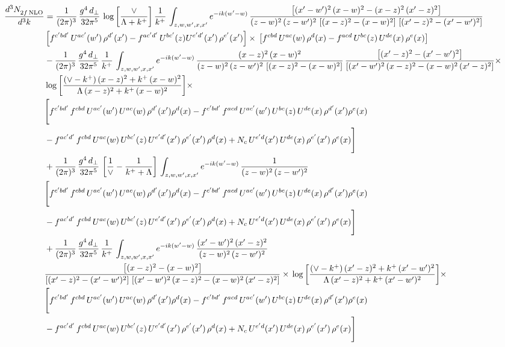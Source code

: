 \documentclass[9pt]{article}
\numberwithin{equation}{section}
\begin{document}
\begin{align}
    \frac{d^{3}N_{2f\,\rm NLO}^{\rm}}{d^{3}k}  & = \frac{1}{(2\pi)^{3}}\, \frac{g^{4}\,d_{\perp}}{32\pi^{5}}\,\log{\left[\frac{\vee}{\Lambda + k^{+}}\right]}\,\frac{1}{k^{+}}\,\int_{z,w,w^{\prime},x,x'} e^{-ik(w^{\prime}-w)}\,\frac{\left[(x'-w')^{2}\, (x-w)^{2} - (x-z)^{2}\, (x'-z)^{2}\right]}{(z-w)^{2}\, (z-w')^{2}\,\left[(x-z)^{2} - (x-w)^{2}\right]\, \left[(x'-z)^{2} - (x'-w')^{2}\right]}\notag \\ &   \left[f^{c'bd'}\, U^{ac'}(w')\,\rho^{d'}(x')-f^{ac'd'}\, U^{bc'}(z)U^{e'd'}(x')\, \rho^{e'}(x')\right]\times\, \left[f^{cbd}\, U^{ac}(w)\,\rho^{d}(x) - f^{acd}\, U^{bc}(z)\,U^{de}(x)\, \rho^{e}(x)\right] \notag \\ & - \frac{1}{(2\pi)^{3}}\, \frac{g^{4}\,d_{\perp}}{32\pi^{5}}\,\frac{1}{k^{+}}\,\int_{z,w,w^{\prime},x,x'} e^{-ik(w^{\prime}-w)}\,\frac{(x-z)^{2}\, (x-w)^{2}}{(z-w)^{2}\, (z-w')^{2}\,\left[(x-z)^{2} - (x-w)^{2}\right]}\,\frac{\left[(x'-z)^{2}-(x'-w')^{2}\right]}{\left[(x'-w')^{2}\, (x-z)^{2} - (x-w)^{2}\, (x'-z)^{2}\right]}\times\notag \\ & \log{\left[\frac{(\vee - k^{+})\, (x-z)^{2} + k^{+}\, (x-w)^{2}}{\Lambda\, (x-z)^{2} + k^{+}\, (x-w)^{2}}\right]}\times\notag \\ & \Bigg[f^{c'bd'}\,f^{cbd}\, U^{ac'}(w')\,U^{ac}(w)\,\rho^{d'}(x')\rho^{d}(x)- f^{c'bd'}\,f^{acd}\,U^{ac'}(w')\,U^{bc}(z)\,U^{de}(x)\,\rho^{d'}(x')\rho^{e}(x) \notag \\ & -f^{ac'd'}\,f^{cbd}\,U^{ac}(w)\,U^{bc'}(z)\,U^{e'd'}(x')\,\rho^{e'}(x')\,\rho^{d}(x) +N_{c}\,U^{e'd}(x')\,U^{de}(x)\,\rho^{e'}(x')\,\rho^{e}(x)\Bigg] \notag \\ & + \frac{1}{(2\pi)^{3}}\, \frac{g^{4}\,d_{\perp}}{32\pi^{5}}\,\left[\frac{1}{\vee} - \frac{1}{k^{+} + \Lambda}\right]\,\int_{z,w,w^{\prime},x,x'} e^{-ik(w^{\prime}-w)}\,\frac{1}{(z-w)^{2}\, (z-w')^{2}}\notag \\ & \Bigg[f^{c'bd'}\,f^{cbd}\, U^{ac'}(w')\,U^{ac}(w)\,\rho^{d'}(x')\rho^{d}(x)- f^{c'bd'}\,f^{acd}\,U^{ac'}(w')\,U^{bc}(z)\,U^{de}(x)\,\rho^{d'}(x')\rho^{e}(x) \notag \\ & -f^{ac'd'}\,f^{cbd}\,U^{ac}(w)\,U^{bc'}(z)\,U^{e'd'}(x')\,\rho^{e'}(x')\,\rho^{d}(x) +N_{c}\,U^{e'd}(x')\,U^{de}(x)\,\rho^{e'}(x')\,\rho^{e}(x)\Bigg] \notag \\ & + \frac{1}{(2\pi)^{3}}\, \frac{g^{4}\,d_{\perp}}{32\pi^{5}}\,\frac{1}{k^{+}}\,\int_{z,w,w^{\prime},x,x'} e^{-ik(w^{\prime}-w)}\,\frac{(x'-w')^{2}\, (x'-z)^{2}}{(z-w)^{2}\, (z-w')^{2}}\notag \\ & \frac{\left[(x-z)^{2} - (x-w)^{2}\right]}{\left[(x'-z)^{2} - (x'-w')^{2}\right]\, \left[(x'-w')^{2}\, (x - z)^{2} - (x-w)^{2}\,(x'-z)^{2}\right]}\times\, \log{\left[\frac{(\vee - k^{+})\, (x'-z)^{2} + k^{+}\, (x'-w')^{2}}{\Lambda\, (x'-z)^{2} + k^{+}\, (x'-w')^{2}}\right]}\times \notag \\ &  \Bigg[f^{c'bd'}\,f^{cbd}\, U^{ac'}(w')\,U^{ac}(w)\,\rho^{d'}(x')\rho^{d}(x)- f^{c'bd'}\,f^{acd}\,U^{ac'}(w')\,U^{bc}(z)\,U^{de}(x)\,\rho^{d'}(x')\rho^{e}(x) \notag \\ & -f^{ac'd'}\,f^{cbd}\,U^{ac}(w)\,U^{bc'}(z)\,U^{e'd'}(x')\,\rho^{e'}(x')\,\rho^{d}(x) +N_{c}\,U^{e'd}(x')\,U^{de}(x)\,\rho^{e'}(x')\,\rho^{e}(x)\Bigg]
\end{align}
\end{document}
